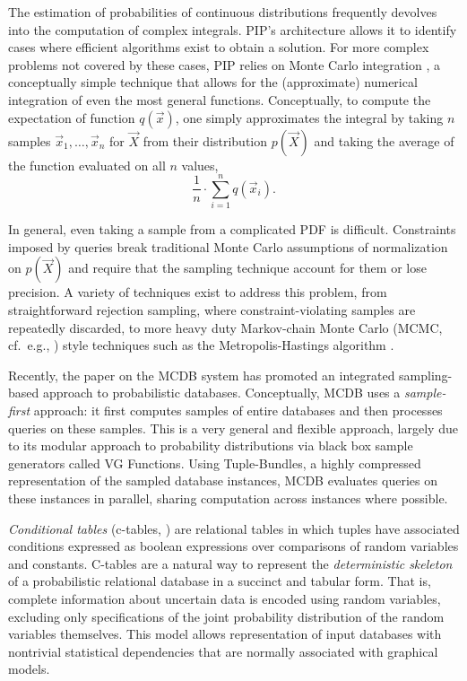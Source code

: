 The estimation of probabilities of continuous distributions frequently devolves into the computation of complex integrals.  PIP's architecture allows it to identify cases where efficient algorithms exist to obtain a solution.  For more complex problems not covered by these cases, PIP relies on Monte Carlo integration \cite{montecarlo}, a conceptually simple technique that allows for the (approximate) numerical integration of even the most general  functions. Conceptually, to compute the expectation of function $q(\vec x)$, one simply approximates the integral by taking $n$ samples $\vec{x}_1, \dots, \vec{x}_n$ for $\vec{X}$ from their distribution $p(\vec X)$  and  taking  the  average of the function evaluated on all $n$ values,
%
\begin{equation}\label{eq:mc_expectation}
\frac{1}{n} \cdot \sum_{i=1}^n q(\vec{x}_i).
\end{equation}

In general, even taking a sample from a complicated PDF is difficult.  Constraints imposed by queries break traditional Monte Carlo assumptions of normalization on $p(\vec X)$ and require that the sampling technique account for them or lose precision.  A variety of techniques exist to address this problem, from straightforward rejection sampling, where constraint-violating samples are repeatedly discarded, to more heavy duty Markov-chain Monte Carlo (MCMC, cf.\ e.g., \cite{GRS1995}) style techniques such as the Metropolis-Hastings algorithm \cite{metropolis,GRS1995}. 

Recently,  the paper  \cite{MCDB} on  the MCDB  system  has promoted an integrated  sampling-based  approach to  probabilistic databases.  Conceptually,  MCDB uses a {\em sample-first}\/ approach: it   first  computes  samples  of  entire databases and then processes queries  on these samples.  This is a very general and flexible approach, largely due to its modular approach to probability distributions via black box sample generators called VG Functions.  Using Tuple-Bundles, a highly compressed representation of the sampled database instances, MCDB evaluates queries on these instances in parallel, sharing computation across instances where possible.  

{\em  Conditional tables}\/  (c-tables, \cite{IL1984})  are relational tables in which tuples have associated conditions expressed as boolean expressions over  comparisons of random variables  and constants. C-tables are a natural way to  represent  the  {\em  deterministic skeleton}\/  of a probabilistic relational  database in  a succinct  and tabular  form.  That  is, complete information  about uncertain data is encoded using random  variables, excluding only  specifications  of the  joint  probability  distribution of  the random  variables   themselves.   This  model   allows  representation of  input databases  with  nontrivial statistical  dependencies that are normally associated with graphical models. 


